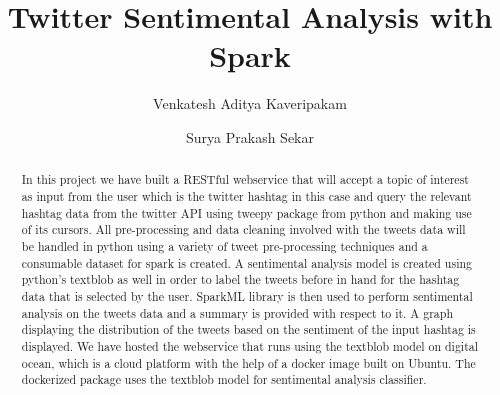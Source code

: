 
\def\paperstatus{100} %
\def\paperchapter{Spark} %
\def\hid{hid-sp18-411,hid-sp18-418} %
\def\volume{9} %

\def\locator{\hid, Volume: \volume, Chapter: \paperchapter, Status: \paperstatus. \newline}

\title{Twitter Sentimental Analysis with Spark}


\author{Venkatesh Aditya Kaveripakam}

\author{Surya Prakash Sekar}

\renewcommand{\shortauthors}{Aditya, Surya}

\begin{abstract}

In this project we have built a RESTful webservice that will accept a topic of 
interest as input from the user which is the twitter hashtag in this case and 
query the relevant hashtag data from the twitter API using tweepy package from 
python and making use of its cursors. All pre-processing and data cleaning 
involved with the tweets data will be handled in python using a variety of 
tweet pre-processing techniques and a consumable dataset for spark is created. A 
sentimental analysis model is created using python's textblob as well in order to label 
the tweets before in hand for the hashtag data that is selected by the user. 
SparkML library is then used to perform sentimental analysis on the tweets data 
and a summary is provided with respect to it. A graph displaying the 
distribution of the tweets based on the sentiment of the input hashtag is 
displayed. We have hosted the webservice that runs using the textblob model on 
digital ocean, which is a cloud platform with the help of a docker image built on 
Ubuntu. The dockerized package uses the textblob model for sentimental analysis 
classifier.

\end{abstract}

